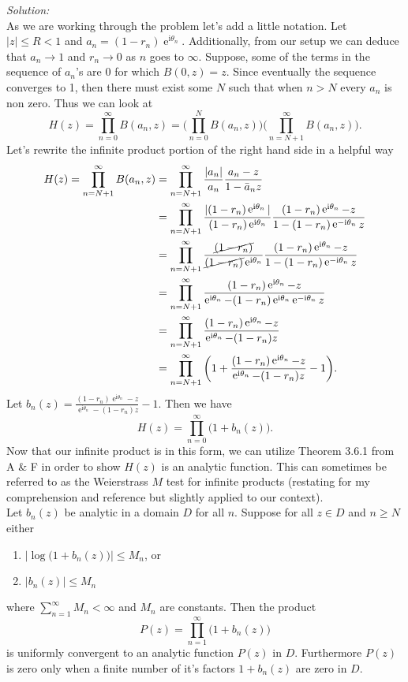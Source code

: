 \documentclass[10pt]{amsart}
\newcommand{\I}{\mathrm{i}}
\DeclareMathOperator{\E}{e}
\theoremstyle{nonumberplain}
\begin{document}
\begin{enumerate}[label={\bf {\arabic*}:}]
\begin{itemize}
\noindent
\textit{Solution:} \\
As we are working through the problem let's add a little notation.
Let $|z| \leq R < 1$ and $a_n = (1 - r_n)\E^{\I \theta_n}$.
Additionally, from our setup we can deduce that $a_n \rightarrow 1$ and $r_n \rightarrow 0$ as $n$ goes to $\infty$.
Suppose, some of the terms in the sequence of $a_n$'s are 0 for which $B(0, z) = z$.
Since eventually the sequence converges to 1, then there must exist some $N$ such that when $n > N$ every $a_n$ is non zero.
Thus we can look at
$$
H(z) = \prod_{n=0}^\infty B(a_n,z) = \Bigg(\prod_{n=0}^N B(a_n,z) \Bigg) \Bigg(\prod_{n = N + 1}^\infty B(a_n,z) \Bigg).
$$
Let's rewrite the infinite product portion of the right hand side in a helpful way
\begin{align*}
H(z) = \prod_{n=N + 1}^\infty B(a_n,z)
	&= \prod_{n=N + 1}^\infty \frac{|a_n|}{a_n} \frac{ a_n - z}{ 1 - \bar a_n z} \\
	&= \prod_{n=N + 1}^\infty \frac{|(1 - r_n)\E^{\I \theta_n}|}{(1 - r_n)\E^{\I \theta_n}} \frac{ (1 - r_n)\E^{\I \theta_n} - z}{ 1 - (1 - r_n)\E^{-\I \theta_n} z} \\
	&= \prod_{n=N + 1}^\infty \frac{\cancel{(1 - r_n)}}{\cancel{(1 - r_n)}\E^{\I \theta_n}} \frac{ (1 - r_n)\E^{\I \theta_n} - z}{ 1 -(1 - r_n)\E^{-\I \theta_n} z} \\
	&= \prod_{n=N + 1}^\infty \frac{ (1 - r_n)\E^{\I \theta_n} - z}{ \E^{\I \theta_n} - (1 - r_n)\E^{\I \theta_n}\E^{-\I \theta_n} z} \\
	&= \prod_{n=N + 1}^\infty \frac{ (1 - r_n)\E^{\I \theta_n} - z}{ \E^{\I \theta_n} - (1 - r_n) z} \\
	&= \prod_{n=N + 1}^\infty \bigg(1 + \frac{ (1 - r_n)\E^{\I \theta_n} - z}{ \E^{\I \theta_n} - (1 - r_n) z} - 1\bigg).
\end{align*}
Let $b_n(z) = \frac{ (1 - r_n)\E^{\I \theta_n} - z}{ \E^{\I \theta_n} - (1 - r_n) z} - 1$.
Then we have 
$$
H(z) = \prod_{n=0}^\infty \big(1 + b_n(z)\big).
$$
Now that our infinite product is in this form, we can utilize Theorem 3.6.1 from A \& F in order to show $H(z)$ is an analytic function.
This can sometimes be referred to as the Weierstrass $M$ test for infinite products (restating for my comprehension and reference but slightly applied to our context). \\

\noindent
Let $b_n(z)$ be analytic in a domain $D$ for all $n$.
Suppose for all $z \in D$ and $n \geq N$ either
\begin{enumerate}
\item $\big|\log \big(1 + b_n(z)\big)\big| \leq M_n$, or
\item $\big|b_n(z)\big| \leq M_n$
\end{enumerate}
where $\sum_{n = 1}^\infty M_n < \infty$ and $M_n$ are constants.
Then the product
$$P (z) = \prod_{n=1}^\infty \big(1 + b_n(z)\big)$$
is uniformly convergent to an analytic function $P(z)$ in $D$.
Furthermore $P(z)$ is zero only when a finite number of it's factors $1 + b_n(z)$ are zero in $D$. \\


\end{itemize}
\end{enumerate}
\end{document}
